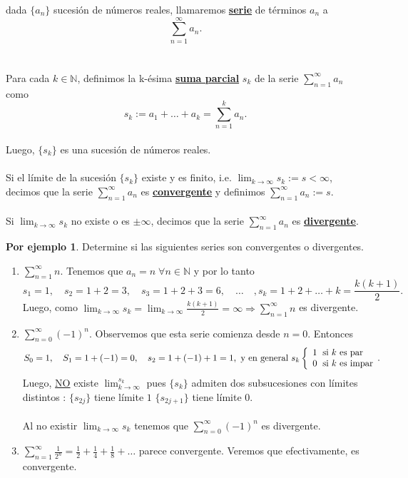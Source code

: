 \documentclass{article}
\theoremstyle{definition}
\newtheorem*{ej}{Por ejemplo}
\theoremstyle{remark}
\begin{document}
\begin{defi}
  dada $ \{ a_n \} $ sucesión de números reales, llamaremos \textbf{\underline{serie}} de términos $a_n$ a $$\sum_{n=1}^{\infty}{a_n}.$$ \\\\
 Para cada $k \in \mathbb{N}$, definimos la k-ésima \textbf{\underline{suma parcial}} $s_k$ de la serie $\sum_{n=1}^{\infty}{a_n}$ como $$s_k:=a_1 + \dots + a_k = \sum_{n=1}^{k}{a_n}.$$ \\
 Luego, $\{s_k\}$ es una sucesión de números reales.\\\\ Si el límite de la sucesión $\{s_k\}$ existe y es finito, i.e. $\lim_{k \to \infty}{s_k}:=s<\infty$, decimos que la serie $\sum_{n=1}^{\infty}{a_n}$ es \textbf{\underline{convergente}} y definimos $\sum_{n=1}^{\infty}{a_n}:=s$. \\\\
 Si $\lim_{k \to \infty}{s_k}$ no existe o es $\pm \infty$, decimos que la serie $\sum_{n=1}^{\infty}{a_n}$ es \textbf{\underline{divergente}}.


\end{defi}

\pagebreak
\begin{ej}
  Determine si las siguientes series son convergentes o divergentes. \\
  \begin{enumerate}
    \item $\sum_{n=1}^{\infty}{n}.$ \quad Tenemos que $a_n=n\; \forall n \in \mathbb{N}$ y por lo tanto \[ 
        s_1=1, \quad s_2=1+2=3, \quad s_3=1+2+3=6, \quad \dots \quad ,s_k=1+2+\dots + k= \frac{k(k+1)}{2} .
      \] 
      Luego, como $\lim_{k \to \infty}{s_k}=\lim_{k \to \infty}{\frac{k(k+1)}{2}}=\infty \Rightarrow \sum_{n=1}^{\infty}{n}$ es divergente.
    \item $\sum_{n=0}^{\infty}{(-1)^n}$. Observemos que esta serie comienza desde $n=0$. Entonces \[ 
        S_0=1, \quad S_1=1 + (-1) = 0, \quad s_2=1+(-1)+1=1, \text{ y en general } s_k \left\{ \begin{array}{l}
            1 \; $\text{ si $k$ es par}$  \\
0 \; $\text{ si $k$ es impar}$  
        \end{array}.\right.
      \]
      Luego, \underline{NO} existe $\lim_{k\to \infty}^{s_k}$ pues $\{s_k\}$ admiten dos subsucesiones con límites distintos : $\{s_{2j}\}$ tiene límite $1$ $\{s_{2j+1} \}$ tiene límite $0$.  \\\\ 
      Al no existir $\lim_{k \to \infty}{s_k}$ tenemos que $\sum_{n=0}^{\infty}{(-1)^n}$ es divergente.

    \item $\sum_{n=1}^{\infty}{\frac{1}{2^n}}=\frac{1}{2}+\frac{1}{4}+\frac{1}{8}+\dots $ parece convergente. Veremos que efectivamente, es convergente.
  \end{enumerate}
\end{ej}
\end{document}
